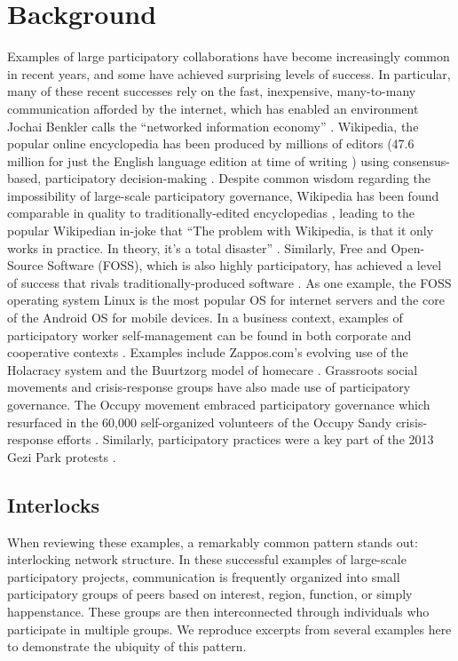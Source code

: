 \documentclass[manuscript,screen,review,acmsmall]{acmart}
\begin{document}
\section{Background}

Examples of large participatory collaborations have become increasingly common in recent years,
and some have achieved surprising levels of success.
In particular, many of these recent successes rely on the fast, inexpensive, many-to-many communication afforded by the internet,
which has enabled an environment Jochai Benkler calls the ``networked information economy''
\cite{benkler_wealth_2006}.
Wikipedia, the popular online encyclopedia has been produced by millions of editors (47.6 million for just the English language edition at time of writing \cite{noauthor_list_2024, noauthor_wikipediawikipedians_2024})
using consensus-based, participatory decision-making \cite{keegan_evolution_2017, forte_scaling_2008}.
Despite common wisdom regarding the impossibility of large-scale participatory governance,
Wikipedia has been found comparable in quality to traditionally-edited encyclopedias \cite{giles_internet_2005},
leading to the popular Wikipedian in-joke that
``The problem with Wikipedia, is that it only works in practice. In theory, it's a total disaster'' \cite{elsharbaty_editing_2016}.
Similarly, Free and Open-Source Software (FOSS),
which is also highly participatory,
has achieved a level of success that rivals traditionally-produced software
\cite{benkler_wealth_2006, raymond_cathedral_1999}.
As one example, the FOSS operating system Linux is the most popular OS for internet servers and the core of the Android OS for mobile devices.
In a business context, examples of participatory worker self-management can be found in both corporate and cooperative contexts \cite{laloux_reinventing_2014, lee_self-managing_2017}.
Examples include Zappos.com's evolving use of the Holacracy system
\cite{robertson_holacracy_2015, groth_zappos_2020}
and the Buurtzorg model of homecare
\cite{monsen_buurtzorg_2013, gray_home_2015}.
Grassroots social movements and crisis-response groups have also made use of participatory governance.
The Occupy movement embraced participatory governance \cite{detar_intertwinkles:_2013, gonzalez-bailon_networked_2016}
which resurfaced in the 60,000 self-organized volunteers of the Occupy Sandy crisis-response efforts \cite{landau_place-based_2017, brugh_combining_2019}.
Similarly, participatory practices were a key part of the 2013 Gezi Park protests
\cite{tufekci_twitter_2017}.

\subsection{Interlocks\label{subsec:interlocks}}
When reviewing these examples, a remarkably common pattern stands out: interlocking network structure.
In these successful examples of large-scale participatory projects,
communication is frequently organized into small participatory groups of peers based on interest, region, function, or simply happenstance.
These groups are then interconnected through individuals who participate in multiple groups.
We reproduce excerpts from several examples here to demonstrate the ubiquity of this pattern.
\end{document}
